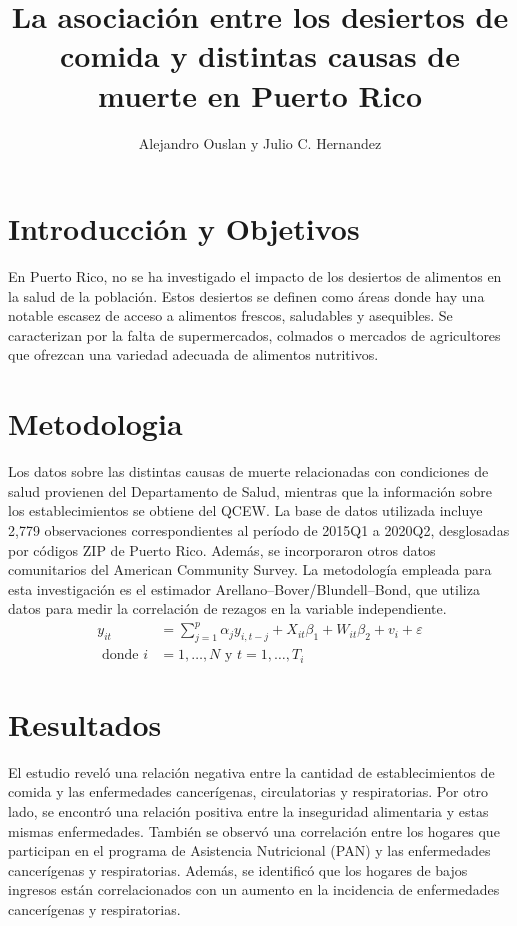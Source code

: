 \documentclass[10pt, oneside]{article}
\title{La asociación entre los desiertos de comida y distintas causas de muerte en Puerto Rico}
\author{Alejandro Ouslan y Julio C. Hernandez}
\affil{Auspiciado por USDA y LEADING Hispanics}
\date{}
\begin{document}
\maketitle

\vspace{.25in}

\section{Introducción y Objetivos}

En Puerto Rico, no se ha investigado el impacto de los desiertos de alimentos en la salud de la población. Estos desiertos se definen como áreas donde hay una notable escasez de acceso a alimentos frescos, saludables y asequibles. Se caracterizan por la falta de supermercados, colmados o mercados de agricultores que ofrezcan una variedad adecuada de alimentos nutritivos.

\section{Metodologia}

Los datos sobre las distintas causas de muerte relacionadas con condiciones de salud provienen del Departamento de Salud, mientras que la información sobre los establecimientos se obtiene del QCEW. La base de datos utilizada incluye 2,779 observaciones correspondientes al período de 2015Q1 a 2020Q2, desglosadas por códigos ZIP de Puerto Rico. Además, se incorporaron otros datos comunitarios del American Community Survey. La metodología empleada para esta investigación es el estimador Arellano–Bover/Blundell–Bond, que utiliza datos para medir la correlación de rezagos en la variable independiente.
\[
	\begin{split}
		y_{it} &= \sum_{j=1}^{p} \alpha_j y_{i,t-j} + X_{it} \beta_1 + W_{it} \beta_2 + v_i + \varepsilon \\
		\text{ donde } i &= 1, \ldots, N \text{ y } t = 1, \ldots, T_i
	\end{split}
\]
\section{Resultados}
El estudio reveló una relación negativa entre la cantidad de establecimientos de comida y las enfermedades cancerígenas, circulatorias y respiratorias. Por otro lado, se encontró una relación positiva entre la inseguridad alimentaria y estas mismas enfermedades. También se observó una correlación entre los hogares que participan en el programa de Asistencia Nutricional (PAN) y las enfermedades cancerígenas y respiratorias. Además, se identificó que los hogares de bajos ingresos están correlacionados con un aumento en la incidencia de enfermedades cancerígenas y respiratorias.
\end{document}
